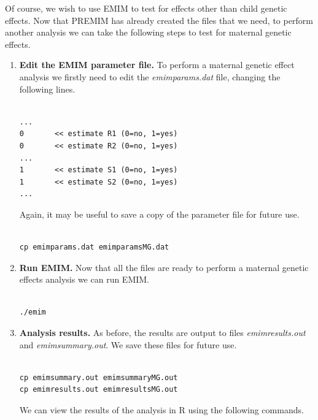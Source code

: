 \documentclass[a4paper,12pt]{article}
\begin{document}
Of course, we wish to use EMIM to test for effects other than child genetic effects. Now that PREMIM has already created the files that we need, to perform another analysis we can take the following steps to test for maternal genetic effects. 
\begin{enumerate}

\item {\bf Edit the EMIM parameter file.} To perform a maternal genetic effect analysis we firstly need to edit the {\it emimparams.dat} file, changing the following lines. \vspace{0.35cm} \begin{lstlisting}

...
0       << estimate R1 (0=no, 1=yes)
0       << estimate R2 (0=no, 1=yes)
...
1       << estimate S1 (0=no, 1=yes)
1       << estimate S2 (0=no, 1=yes)
...

\end{lstlisting} \vspace{0.35cm}Again, it may be useful to save a copy of the parameter file for future use. \vspace{0.35cm} \begin{lstlisting}

cp emimparams.dat emimparamsMG.dat

\end{lstlisting} \vspace{0.35cm}
\item {\bf Run EMIM.} Now that all the files are ready to perform a maternal genetic effects analysis we can run EMIM. \vspace{0.35cm} \begin{lstlisting}

./emim

\end{lstlisting} \vspace{0.35cm}
\item {\bf Analysis results.} As before, the results are output to files {\it emimresults.out} and {\it emimsummary.out}. We save these files for future use. \vspace{0.35cm} \begin{lstlisting}

cp emimsummary.out emimsummaryMG.out
cp emimresults.out emimresultsMG.out

\end{lstlisting} \vspace{0.35cm}We can view the results of the analysis in R using the following commands. \vspace{0.35cm} \begin{lstlisting}


\end{lstlisting}
\end{enumerate}
\end{document}
